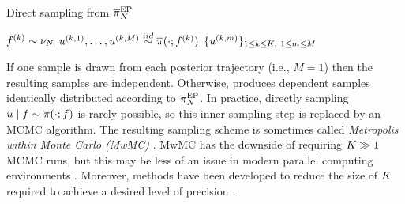 \documentclass[12pt]{article}
\begin{document}
\begin{algorithm}[H]
    \caption{Direct sampling from $\overline{\pi}_{N}^{\mathrm{EP}}$}
    \label{alg:ep}
    \begin{algorithmic}[1]
        		\State $f^{(k)} \sim \nu_{N}$ 
		\State $u^{(k, 1)}, \dots, u^{(k, M)} \overset{iid}{\sim} \overline{\pi}(\cdot; f^{(k)})$ 
	\EndFor
	\State \Return $\{u^{(k, m)}\}_{1 \leq k \leq K, \ 1 \leq m \leq M}$
	\EndFunction
    \end{algorithmic}
\end{algorithm}
If one sample is drawn from each posterior trajectory (i.e., $M=1$) then the resulting samples are 
independent. Otherwise,  produces dependent samples identically distributed according to
$\overline{\pi}_{N}^{\mathrm{EP}}$. In practice, directly sampling $u \mid f \sim \overline{\pi}(\cdot; f)$
is rarely possible, so this inner sampling step is replaced by an MCMC algorithm.
The resulting sampling scheme is sometimes called \textit{Metropolis within Monte Carlo (MwMC)} 
\citep{garegnani2021NoisyMCMC}. MwMC has the downside of requiring $K \gg 1$
MCMC runs, but this may be less of an issue in modern parallel computing environments \citep{BurknerSurrogate}. 
Moreover, methods have been developed to reduce the size of $K$ required to achieve a
desired level of precision \citep{BurknerTwoStep}. 
\end{document}
